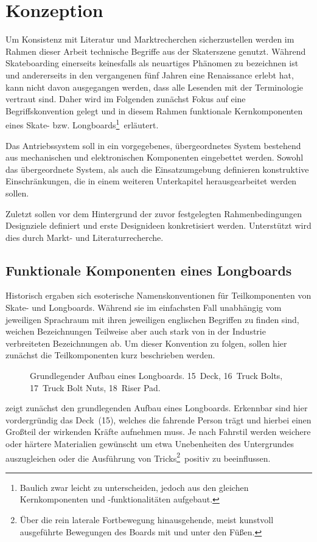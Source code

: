 \chapter{Konzeption}
	Um Konsistenz mit Literatur und Marktrecherchen sicherzustellen werden im Rahmen dieser Arbeit technische Begriffe aus der Skaterszene genutzt.
	Während Skateboarding einerseits keinesfalls als neuartiges Phänomen zu bezeichnen ist und  andererseits in den vergangenen fünf Jahren eine Renaissance erlebt hat, kann nicht davon ausgegangen werden, dass alle Lesenden mit der Terminologie vertraut sind.
	Daher wird im Folgenden zunächst Fokus auf eine Begriffskonvention gelegt und in diesem Rahmen funktionale Kernkomponenten eines Skate- bzw. Longboards\footnote{\hspace{1mm} Baulich zwar leicht zu unterscheiden, jedoch aus den gleichen Kernkomponenten und -funktionalitäten aufgebaut.}~erläutert.\par\medskip
	Das Antriebssystem soll in ein vorgegebenes, übergeordnetes System bestehend aus mechanischen und elektronischen Komponenten eingebettet werden.
	Sowohl das übergeordnete System, als auch die Einsatzumgebung definieren konstruktive Einschränkungen, die in einem weiteren Unterkapitel herausgearbeitet werden sollen.\par\medskip
	Zuletzt sollen vor dem Hintergrund der zuvor festgelegten Rahmenbedingungen Designziele definiert und erste Designideen konkretisiert werden.
	Unterstützt wird dies durch Markt- und Literaturrecherche.
	\section{Funktionale Komponenten eines Longboards}
		Historisch ergaben sich esoterische Namenskonventionen für Teilkomponenten von Skate- und Longboards.
		Während sie im einfachsten Fall unabhängig vom jeweiligen Sprachraum mit ihren jeweiligen englischen Begriffen zu finden sind, weichen Bezeichnungen Teilweise aber auch stark von in der Industrie verbreiteten Bezeichnungen ab.
		Um dieser Konvention zu folgen, sollen hier zunächst die Teilkomponenten kurz beschrieben werden.\par\medskip
		\begin{figure}[h]
			\centering
			
			\caption[Grundlegender Aufbau eines Longboards]{Grundlegender Aufbau eines Longboards. 15~Deck, 16~Truck Bolts, 17~Truck Bolt Nuts, 18~Riser Pad.}\label{fig:longboard}
		\end{figure}
		 zeigt zunächst den grundlegenden Aufbau eines Longboards.
		Erkennbar sind hier vordergründig das Deck~(15), welches die fahrende Person trägt und hierbei einen Großteil der wirkenden Kräfte aufnehmen muss.
		Je nach Fahrstil werden weichere oder härtere Materialien gewünscht um etwa Unebenheiten des Untergrundes auszugleichen oder die Ausführung von Tricks\footnote{\hspace{1mm} Über die rein laterale Fortbewegung hinausgehende, meist kunstvoll ausgeführte Bewegungen des Boards mit und unter den Füßen.}~positiv zu beeinflussen.

